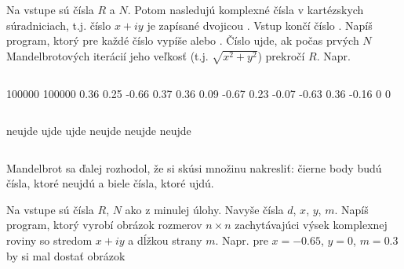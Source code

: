 \begin{uloha}
  \label{uloha-mandelbrot}
  Na vstupe sú čísla $R$ a $N$. Potom nasledujú komplexné čísla v kartézskych
  súradniciach, t.j. číslo $x+iy$ je zapísané dvojicou .
  Vstup končí číslo . Napíš program, ktorý pre každé číslo
  vypíše  alebo . Číslo ujde, ak počas prvých $N$ 
  Mandelbrotových iterácií jeho veľkosť (t.j. $\sqrt{x^2+y^2}$) prekročí $R$.
  Napr. 


  \begin{column}{0.45}
\begin{outputBox}
100000 100000
0.36 0.25
-0.66 0.37
0.36 0.09
-0.67 0.23
-0.07 -0.63
0.36 -0.16
0 0
\end{outputBox}
\end{column}\hfill
\begin{column}{0.45}
\begin{outputBox}
neujde
ujde
ujde
neujde
neujde
neujde
\end{outputBox}
\end{column}
\end{uloha}

Mandelbrot sa ďalej rozhodol, že si skúsi množinu nakresliť: čierne body budú čísla, 
ktoré neujdú a biele čísla, ktoré ujdú.

\begin{uloha}
  Na vstupe sú čísla $R$, $N$ ako z minulej úlohy. Navyše čísla $d$, $x$, $y$, $m$.
  Napíš program, ktorý vyrobí obrázok rozmerov $n\times n$ zachytávajúci výsek
  komplexnej roviny so stredom $x+iy$ a dĺžkou strany $m$.
  Napr. pre $x=-0.65$, $y=0$, $m=0.3$ by si mal dostať obrázok

  
  {
  \setlength{\fboxsep}{0pt}
  \centerline{}
}
\end{uloha}



